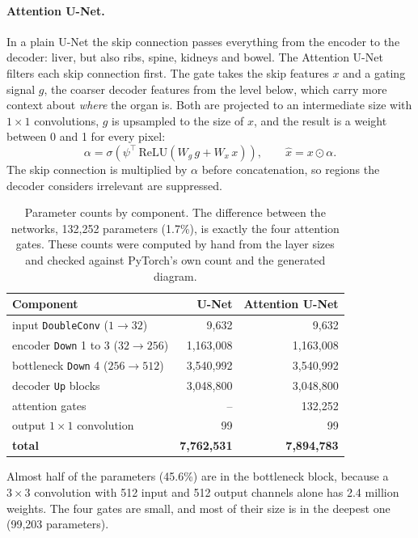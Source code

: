 \documentclass[11pt,a4paper]{article}
\newcommand{\code}[1]{\texttt{#1}}
\begin{document}
\paragraph{Attention U-Net.} In a plain U-Net the skip connection passes
everything from the encoder to the decoder: liver, but also ribs, spine, kidneys
and bowel. The Attention U-Net filters each skip connection first. The gate takes
the skip features $x$ and a gating signal $g$, the coarser decoder features from
the level below, which carry more context about \emph{where} the organ is. Both
are projected to an intermediate size with $1\times1$ convolutions, $g$ is
upsampled to the size of $x$, and the result is a weight between 0 and 1 for every
pixel:
\[
\alpha = \sigma\!\left(\psi^{\top}\,\mathrm{ReLU}\!\left(W_g\, g + W_x\, x\right)\right),
\qquad \hat{x} = x \odot \alpha .
\]
The skip connection is multiplied by $\alpha$ before concatenation, so regions the
decoder considers irrelevant are suppressed.

\begin{table}[H]
\centering\small
\begin{tabular}{lrr}
\toprule
\textbf{Component} & \textbf{U-Net} & \textbf{Attention U-Net} \\
\midrule
input \code{DoubleConv} ($1\to32$) & 9{,}632 & 9{,}632 \\
encoder \code{Down} 1 to 3 ($32\to256$) & 1{,}163{,}008 & 1{,}163{,}008 \\
bottleneck \code{Down} 4 ($256\to512$) & 3{,}540{,}992 & 3{,}540{,}992 \\
decoder \code{Up} blocks & 3{,}048{,}800 & 3{,}048{,}800 \\
attention gates & -- & 132{,}252 \\
output $1\times1$ convolution & 99 & 99 \\
\midrule
\textbf{total} & \textbf{7{,}762{,}531} & \textbf{7{,}894{,}783} \\
\bottomrule
\end{tabular}
\caption{Parameter counts by component. The difference between the networks,
132{,}252 parameters (1.7\%), is exactly the four attention gates. These counts
were computed by hand from the layer sizes and checked against PyTorch's own count
and the generated diagram.}
\label{tab:seg_params}
\end{table}

Almost half of the parameters (45.6\%) are in the bottleneck block, because a
$3\times3$ convolution with 512 input and 512 output channels alone has 2.4
million weights. The four gates are small, and most of their size is in the
deepest one (99{,}203 parameters).
\end{document}
